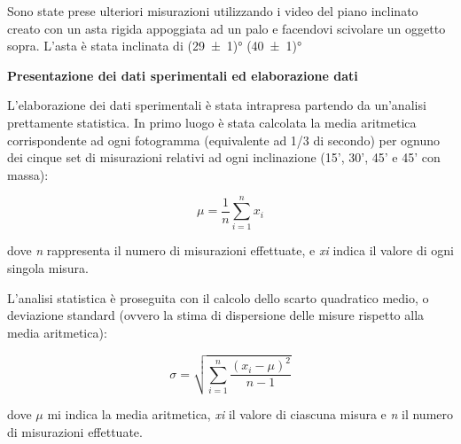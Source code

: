 \documentclass[a4paper,11pt,titlepage]{book}
\begin{document}
\begin{flushleft}
Sono state prese ulteriori misurazioni utilizzando i video del piano inclinato creato con un asta rigida appoggiata ad un palo e facendovi scivolare un oggetto sopra. L'asta è stata inclinata di (29\SI{ \pm 1}{})° (40\SI{ \pm 1}{})°
\end{flushleft}
\newpage







\begin{center}
\begin{large}
\textbf{Presentazione dei dati sperimentali ed elaborazione dati}
\end{large}
\end{center}
\vspace{0.15cm}

\begin{flushleft}
L’elaborazione dei dati sperimentali è stata intrapresa partendo da un’analisi prettamente statistica. In primo luogo è stata calcolata la media aritmetica corrispondente ad ogni fotogramma (equivalente ad 1/3 di secondo) per ognuno dei cinque set di misurazioni relativi ad ogni inclinazione (15’, 30’, 45’ e 45’ con massa):
\end{flushleft}
\vspace{0.5cm}

\begin{equation}
\mu=\frac{1}{n}\sum\limits_{i=1}^n x_i
\end{equation}
\vspace{0.5cm}

\begin{flushleft}
dove \emph{n} rappresenta il numero di misurazioni effettuate, e \emph{xi} indica il valore di ogni singola misura.\\
\end{flushleft}

\vspace{0.5cm}
\begin{flushleft}
L’analisi statistica è proseguita con il calcolo dello scarto quadratico medio, o deviazione standard (ovvero la stima di dispersione delle misure rispetto alla media aritmetica):
\end{flushleft}

\begin{equation}
\sigma=\sqrt{\sum\limits_{i=1}^n\frac{(x_i-\mu)^2}{n-1}}
\end{equation}
\vspace{0.5cm}
\begin{flushleft}
dove $\mu$ mi indica la media aritmetica, \emph{xi} il valore di ciascuna misura e \emph{n} il numero di misurazioni effettuate.\\
\end{flushleft}
\vspace{0.5cm}
\end{document}
